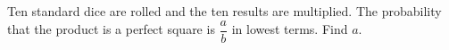 Ten standard dice are rolled and the ten results are multiplied. The probability that the product is a perfect square is $\dfrac ab$ in lowest terms. Find $a$.
